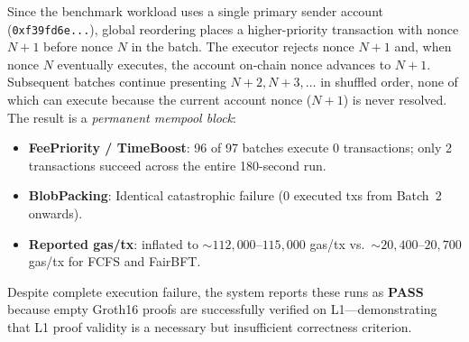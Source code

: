 Since the benchmark workload uses a single primary sender account
(\texttt{0xf39fd6e...}), global reordering places a higher-priority
transaction with nonce $N+1$ before nonce $N$ in the batch.  The executor
rejects nonce $N+1$ and, when nonce $N$ eventually executes, the account
on-chain nonce advances to $N+1$.  Subsequent batches continue presenting
$N+2, N+3, \ldots$ in shuffled order, none of which can execute because
the current account nonce ($N+1$) is never resolved.  The result is a
\emph{permanent mempool block}:

\begin{itemize}
  \item \textbf{FeePriority / TimeBoost}: 96 of 97 batches execute
    0 transactions; only 2 transactions succeed across the entire
    180-second run.
  \item \textbf{BlobPacking}: Identical catastrophic failure (0 executed
    txs from Batch~2 onwards).
  \item \textbf{Reported gas/tx}: inflated to ${\sim}112{,}000$--$115{,}000$
    gas/tx vs.\ ${\sim}20{,}400$--$20{,}700$ gas/tx for FCFS and FairBFT.
\end{itemize}

Despite complete execution failure, the system reports these runs as
\textbf{PASS} because empty Groth16 proofs are successfully verified
on L1---demonstrating that L1 proof validity is a necessary but
insufficient correctness criterion.

